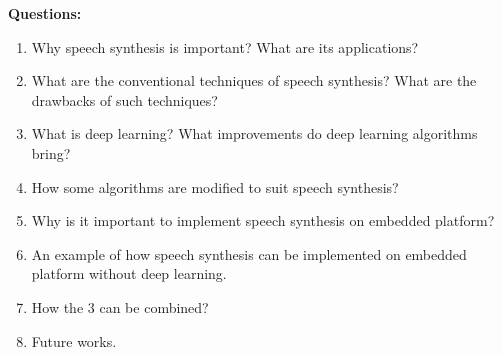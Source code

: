 \iffalse
\vspace{2em}
\textbf{\large Open points:}
\vspace{1em}
\begin{itemize}[leftmargin=10pt]
	\item Improvements of deep learning in speech synthesis also about voice quality. Does that make sense in this context?
	\item Where the focus of this paper should be (deep learning / speech synthesis / embedded devices)? Most papers are available for:
	\begin{itemize}
		\item deep learning <---> speech synthesis
		\item deep learning <---> embedded devices
	\end{itemize}
	\item Where to go into technical detail? Suggestion: One way of improving speech synthesis with deep learning.
	\item Core paper on \ac{SPSS} \cite{zen:statistical} available in two versions (4 and 23 pages). Which one to use as core paper? Suggestion: 4 page version as core paper and 23 page version as reference.
	\item Connection between the improvements of deep learning on speech synthesis (Section~\ref{subsec:deepspeech}) and the implementation of speech synthesis with/without deep learning (Section~\ref{sec:embeddedspeech})?
	\item Strictly spoken a smartphone/tablet is not an "embedded" device. Is some form of further declaration necessary in this context?
\end{itemize}
\fi

\vspace{2em}
\textbf{\large Questions:}
\vspace{1em}
\begin{enumerate}[leftmargin=16pt]
	\item Why speech synthesis is important? What are its applications?
	\item What are the conventional techniques of speech synthesis? What are the drawbacks of such techniques?
	\item What is deep learning? What improvements do deep learning algorithms bring?
	\item How some algorithms are modified to suit speech synthesis?
	\item Why is it important to implement speech synthesis on embedded platform?
	\item An example of how speech synthesis can be implemented on embedded platform without deep learning.
	\item How the 3 can be combined?
	\item Future works.
\end{enumerate}


